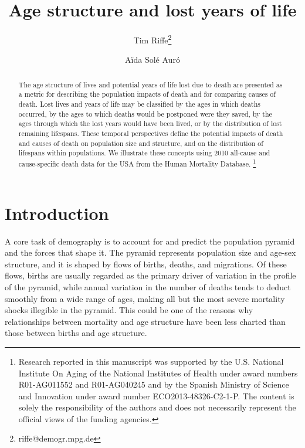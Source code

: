 \documentclass{article}
\newcommand\ackn[1]{%
  \begingroup
  \renewcommand\thefootnote{}\footnote{#1}%
  \addtocounter{footnote}{-1}%
  \endgroup
}
\begin{document}
\title{Age structure and lost years of life}

\author[1]{Tim Riffe\thanks{riffe@demogr.mpg.de}}
\author[2]{A{\"i}da Sol\'{e} Aur\'{o}}

\maketitle

% 
\begin{abstract}
The age structure of lives and potential years of life lost due to death are
presented as a metric for describing the population impacts of death and for comparing causes of death. Lost lives and years of life may be classified by the ages in which
deaths occurred, by the ages to which deaths would be postponed were they saved, by the
ages through which the lost years would have been lived, or by the distribution of
lost remaining lifespans. These temporal perspectives define the
potential impacts of death and causes of death on population size and structure,
and on the distribution of lifespans within populations. We
illustrate these concepts using 2010 all-cause and cause-specific death
data for the USA from the Human Mortality Database. \ackn{Research reported in this manuscript
was supported by the U.S.
National Institute On Aging of the National Institutes of Health under award numbers R01-AG011552 and R01-AG040245 and by the Spanish Ministry of Science and Innovation under award
number ECO2013-48326-C2-1-P. The content is solely the responsibility of the
authors and does not necessarily represent the official views of the funding
agencies.}
\end{abstract}

\section*{Introduction}
A core task of demography is to account for and predict the population
pyramid and the forces that shape it. The pyramid represents population
size and age-sex structure, and it is shaped by flows of births,
deaths, and migrations. Of these flows, births are usually regarded
as the primary driver of variation in the profile of the pyramid, while annual
variation in the number of deaths tends to deduct smoothly from a wide range of ages, making all but the most severe mortality shocks illegible in the pyramid. This could be one of the
reasons why relationships between mortality and age structure have been less charted than those between births and age structure.
\end{document}
